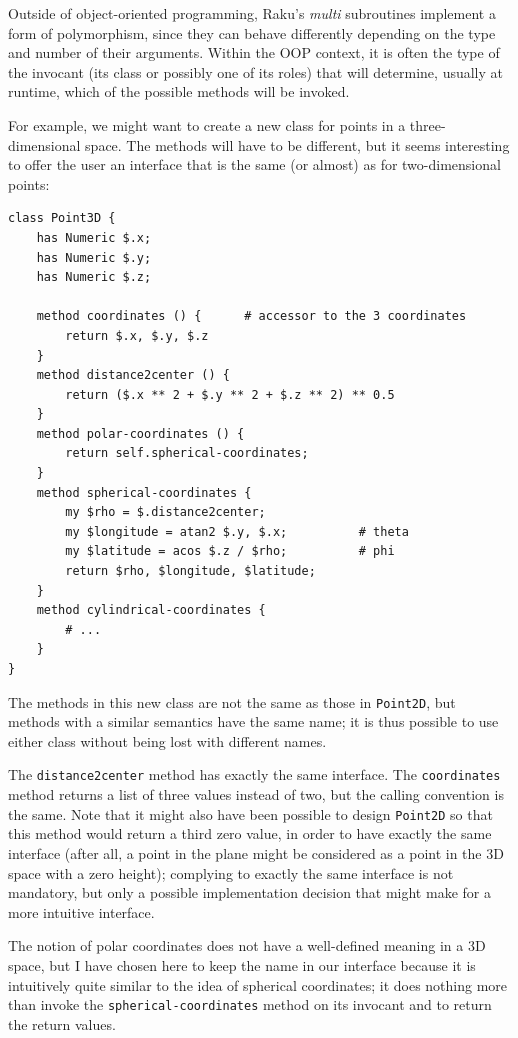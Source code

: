 Outside of object-oriented programming, Raku's 
\emph{multi} subroutines implement a form of polymorphism, 
since they can behave differently depending on the 
type and number of their arguments. Within the OOP context, 
it is often the type of the invocant (its class or possibly one 
of its roles) that will determine, usually at runtime, 
which of the possible methods will be invoked.

For example, we might want to create a new class for points 
in a three-dimensional space. The methods will have to be 
different, but it seems interesting to offer the user an 
interface that is the same (or almost) as for two-dimensional 
points:

\begin{verbatim}
class Point3D {
    has Numeric $.x;
    has Numeric $.y;
    has Numeric $.z;
    
    method coordinates () {      # accessor to the 3 coordinates
        return $.x, $.y, $.z
    }
    method distance2center () {
        return ($.x ** 2 + $.y ** 2 + $.z ** 2) ** 0.5
    }
    method polar-coordinates () {
    	return self.spherical-coordinates;
    }
    method spherical-coordinates {
    	my $rho = $.distance2center;
    	my $longitude = atan2 $.y, $.x;          # theta
    	my $latitude = acos $.z / $rho;          # phi 
    	return $rho, $longitude, $latitude;
    }
    method cylindrical-coordinates {
    	# ...
    }
}
\end{verbatim}

The methods in this new class are not the same as those in 
{\tt Point2D}, but methods with a similar semantics have 
the same name; it is thus possible to use either class 
without being lost with different names. 

The {\tt distance2center} method has exactly the same interface. 
The {\tt coordinates} method returns a list of three values 
instead of two, but the calling convention is the same. Note 
that it might also have been possible to design {\tt Point2D} 
so that this method would return a third zero value, in order 
to have exactly the same interface (after all, a point in 
the plane might be considered as a point in the 3D space 
with a zero height); complying to exactly the same 
interface is not mandatory, but only a possible implementation 
decision that might make for a more intuitive interface. 

The notion of polar coordinates does not have a well-defined 
meaning in a 3D space, but I have chosen here to keep the name 
in our interface because it is intuitively quite similar to 
the idea of spherical coordinates; it does nothing more 
than invoke the \verb'spherical-coordinates' method on 
its invocant and to return the return values.

